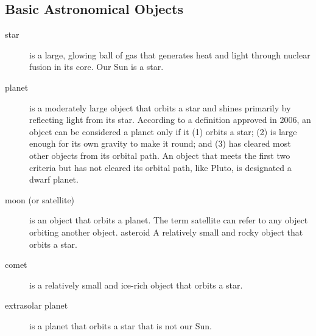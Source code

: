 \documentclass[12pt]{article}
\begin{document}
\subsection{Basic Astronomical Objects}
\begin{description}
\item[star] is a large, glowing ball of gas that generates heat and light through nuclear fusion in its core. Our Sun is a star.
\item[planet] is a moderately large object that orbits a star and shines primarily by reflecting light from its star. According to a definition
approved in 2006, an object can be considered a planet only if it (1) orbits a star; (2) is large enough for its own gravity to make
it round; and (3) has cleared most other objects from its orbital path. An object that meets the first two criteria but has not
cleared its orbital path, like Pluto, is designated a dwarf planet.
\item[moon (or satellite)] is an object that orbits a planet. The term satellite can refer to any object orbiting another object.
asteroid A relatively small and rocky object that orbits a star.
\item[comet] is a relatively small and ice-rich object that orbits a star.
\item[extrasolar planet] is a planet that orbits a star that is not our Sun.
\end{description}
\end{document}
